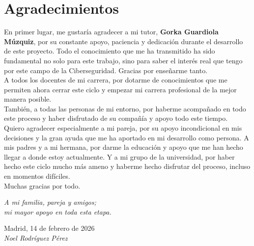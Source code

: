 \cleardoublepage

\chapter*{Agradecimientos}

En primer lugar, me gustaría agradecer a mi tutor, \textbf{Gorka Guardiola Múzquiz}, por su constante apoyo, paciencia y dedicación durante el desarrollo de este proyecto.
Todo el conocimiento que me ha transmitido ha sido fundamental no solo para este trabajo, sino para saber el interés real que tengo por este campo de la Ciberseguridad.
Gracias por enseñarme tanto.\\

A todos los docentes de mi carrera, por dotarme de conocimientos que me permiten ahora cerrar este ciclo y empezar mi carrera profesional de la mejor manera posible.\\

También, a todas las personas de mi entorno, por haberme acompañado en todo este proceso y haber disfrutado de su compañía y apoyo todo este tiempo.\\

Quiero agradecer especialmente a mi pareja, por su apoyo incondicional en mis decisiones y la gran ayuda que me ha aportado en mi desarrollo como persona. A mis padres y a mi hermana, por darme la educación y apoyo que me han hecho llegar a donde estoy actualmente.
Y a mi grupo de la universidad, por haber hecho este ciclo mucho más ameno y haberme hecho disfrutar del proceso, incluso en momentos difíciles.\\

Muchas gracias por todo.

\begin{flushright}
		\vspace{3.0 cm}
		\emph{A mi familia, pareja y amigos;\\
      mi mayor apoyo en toda esta etapa.}\\
		\par
		\vspace{0.5 cm}
		Madrid, 14 de febrero de 2026\\ %
		\emph{Noel Rodríguez Pérez}
\end{flushright}

\thispagestyle{empty}

